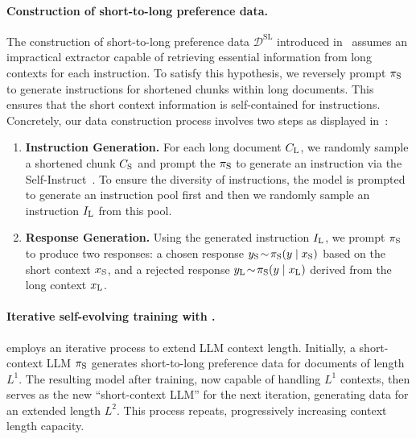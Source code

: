 \paragraph{Construction of short-to-long preference data.}
The construction of short-to-long preference data $\mathcal{D}^{\text{SL}}$ introduced in~ assumes an impractical extractor capable of retrieving essential information from long contexts for each instruction. To satisfy this hypothesis, we reversely prompt $\pi_\text{S}$ to generate instructions for shortened chunks within long documents. This ensures that the short context information is self-contained for instructions. Concretely, our data construction process involves two steps as displayed in~:
\begin{enumerate}
    \item \textbf{Instruction Generation.} 
    For each long document $C_\textrm{L}$, we randomly sample a shortened chunk $C_\text{S}$ and prompt the $\pi_\text{S}$ to generate an instruction via the Self-Instruct~\citep{wang-etal-2023-self-instruct}. To ensure the diversity of instructions, the model is prompted to generate an instruction pool first and then we randomly sample an instruction $I_\text{L}$ from this pool.
    \item \textbf{Response Generation.} Using the generated instruction $I_\text{L}$, we prompt $\pi_\text{S}$ to produce two responses: a chosen response $y_\text{S} \!\sim\! \pi_\text{S}(y\mid x_\text{S})$ based on the short context $x_\text{S}$, and a rejected response $y_\text{L} \!\sim\! \pi_\text{S}(y\mid x_\text{L})$ derived from the long context $x_\text{L}$. 
\end{enumerate}






\paragraph{Iterative self-evolving training with \ourMethod.}
\ourMethod{} employs an iterative process to extend LLM context length. Initially, a short-context LLM $\pi_\text{S}$ generates short-to-long preference data for documents of length $L^1$. The resulting model after \ourMethod{} training, now capable of handling $L^1$ contexts, then serves as the new ``short-context LLM'' for the next iteration, generating data for an extended length $L^2$. This process repeats, progressively increasing context length capacity.


